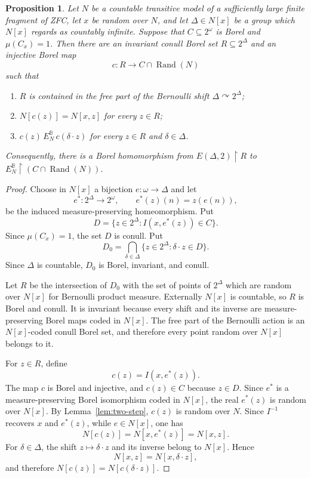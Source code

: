 \documentclass[11pt]{amsart}
\newtheorem{proposition}[theorem]{Proposition}
\theoremstyle{definition}
\theoremstyle{remark}
\newcommand{\B}{\mathbb B}
\newcommand{\Rand}{\operatorname{Rand}}
\newcommand{\restr}{\mathbin{\upharpoonright}}
\begin{document}
\begin{proposition}\label{prop:second-coordinate}
Let $N$ be a countable transitive model of a sufficiently large finite fragment of ZFC, let $x$ be random over $N$, and let $\Delta\in N[x]$ be a group which $N[x]$ regards as countably infinite.  Suppose that $C\subseteq2^\omega$ is Borel and $\mu(C_x)=1$.  Then there are an invariant conull Borel set $R\subseteq2^\Delta$ and an injective Borel map
\[
 c\colon R\longrightarrow C\cap\Rand(N)
\]
such that
\begin{enumerate}
\item $R$ is contained in the free part of the Bernoulli shift $\Delta\curvearrowright2^\Delta$;
\item $N[c(z)]=N[x,z]$ for every $z\in R$;
\item $c(z)\,E_N^{\B}\,c(\delta\cdot z)$ for every $z\in R$ and $\delta\in\Delta$.
\end{enumerate}
Consequently, there is a Borel homomorphism from $E(\Delta,2)\restr R$ to $E_N^{\B}\restr(C\cap\Rand(N))$.
\end{proposition}

\begin{proof}
Choose in $N[x]$ a bijection $e\colon\omega\to\Delta$ and let
\[
 e^*\colon2^\Delta\longrightarrow2^\omega,
 \qquad e^*(z)(n)=z(e(n)),
\]
be the induced measure-preserving homeomorphism.  Put
\[
 D=\{z\in2^\Delta:I(x,e^*(z))\in C\}.
\]
Since $\mu(C_x)=1$, the set $D$ is conull.  Put
\[
 D_0=\bigcap_{\delta\in\Delta}\{z\in2^\Delta:\delta\cdot z\in D\}.
\]
Since $\Delta$ is countable, $D_0$ is Borel, invariant, and conull.

Let $R$ be the intersection of $D_0$ with the set of points of $2^\Delta$ which are random over $N[x]$ for Bernoulli product measure.  Externally $N[x]$ is countable, so $R$ is Borel and conull.  It is invariant because every shift and its inverse are measure-preserving Borel maps coded in $N[x]$.  The free part of the Bernoulli action is an $N[x]$-coded conull Borel set, and therefore every point random over $N[x]$ belongs to it.

For $z\in R$, define
\[
 c(z)=I(x,e^*(z)).
\]
The map $c$ is Borel and injective, and $c(z)\in C$ because $z\in D$.  Since $e^*$ is a measure-preserving Borel isomorphism coded in $N[x]$, the real $e^*(z)$ is random over $N[x]$.  By Lemma~\ref{lem:two-step}, $c(z)$ is random over $N$.  Since $I^{-1}$ recovers $x$ and $e^*(z)$, while $e\in N[x]$, one has
\[
 N[c(z)]=N[x,e^*(z)]=N[x,z].
\]
For $\delta\in\Delta$, the shift $z\mapsto\delta\cdot z$ and its inverse belong to $N[x]$.  Hence
\[
 N[x,z]=N[x,\delta\cdot z],
\]
and therefore $N[c(z)]=N[c(\delta\cdot z)]$.
\end{proof}
\end{document}
